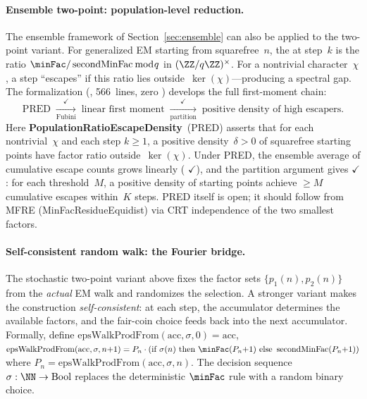 \paragraph{Ensemble two-point: population-level reduction.}
The ensemble framework of Section~\ref{sec:ensemble} can also be
applied to the two-point variant.  For generalized EM starting from
squarefree~$n$, the  at step~$k$ is the ratio
$\minFac / \operatorname{secondMinFac} \bmod q$ in
$(\ZZ/q\ZZ)^\times$.  For a nontrivial character~$\chi$, a step
``escapes'' if this ratio lies outside~$\ker(\chi)$---producing a
spectral gap.  The formalization
(, 566~lines, zero )
develops the full first-moment chain:
\[
  \text{PRED}
  \;\xrightarrow[\text{Fubini}]{\checkmark}\;
  \text{linear first moment}
  \;\xrightarrow[\text{partition}]{\checkmark}\;
  \text{positive density of high escapers.}
\]
Here \textbf{PopulationRatioEscapeDensity}~(PRED) asserts that for
each nontrivial~$\chi$ and each step $k \geq 1$, a positive
density~$\delta > 0$ of squarefree starting points have factor ratio
outside~$\ker(\chi)$.  Under PRED, the ensemble average of cumulative
escape counts grows linearly
(
{\color{leanink}$\checkmark$}), and the partition argument gives
{\color{leanink}$\checkmark$}: for each threshold~$M$, a positive
density of starting points achieve $\geq M$ cumulative escapes
within~$K$ steps.  PRED itself is open; it should follow from
MFRE (MinFacResidueEquidist) via CRT independence of the two
smallest factors.

\paragraph{Self-consistent random walk: the Fourier bridge.}
The stochastic two-point variant above fixes the factor sets
$\{p_1(n), p_2(n)\}$ from the \emph{actual} EM walk and randomizes
the selection.  A stronger variant makes the construction
\emph{self-consistent}: at each step, the accumulator determines the
available factors, and the fair-coin choice feeds back into the next
accumulator.  Formally, define
$\mathrm{epsWalkProdFrom}(\mathrm{acc}, \sigma, 0) = \mathrm{acc}$,
$\mathrm{epsWalkProdFrom}(\mathrm{acc}, \sigma, n{+}1)
= P_n \cdot (\text{if } \sigma(n) \text{ then } \minFac(P_n{+}1)
\text{ else } \operatorname{secondMinFac}(P_n{+}1))$
where $P_n = \mathrm{epsWalkProdFrom}(\mathrm{acc}, \sigma, n)$.
The decision sequence $\sigma : \NN \to \mathrm{Bool}$ replaces the
deterministic $\minFac$ rule with a random binary choice.

